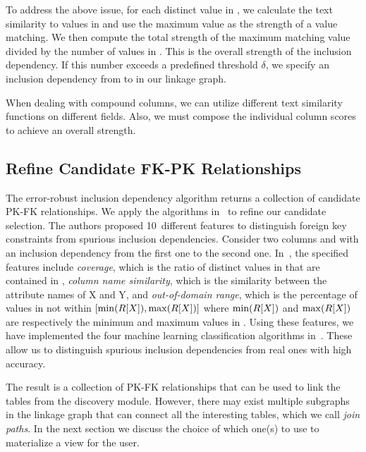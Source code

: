 To address the above issue, for each distinct value in \RX, we calculate the
text similarity to values in \SY and use the maximum value as the strength of a
value matching. We then compute the total strength of the maximum matching value
divided by the number of values in \RX. This is the overall strength of the
inclusion dependency.  If this number exceeds a predefined threshold $\delta$,
we specify an inclusion dependency from \RX to \SY in our linkage graph.

When dealing with compound columns, we can utilize different text similarity functions on different fields. 
Also, we must compose the individual column scores to achieve an overall strength.


\subsection{Refine Candidate FK-PK Relationships}\label{subsec:refine}


The error-robust inclusion dependency algorithm returns a collection of candidate PK-FK relationships.
We apply the algorithms in~\cite{DBLP:conf/webdb/RostinABNL09} to refine our candidate selection. The authors proposed 10~different features to distinguish foreign key constraints from spurious inclusion dependencies. Consider two columns \RX and \SY with an inclusion dependency from the first one to the second one. In~\cite{DBLP:conf/webdb/RostinABNL09}, the specified features include 
\emph{coverage}, which is the ratio of distinct values in \RX that are contained in \SY, 
\emph{column name similarity}, which is the similarity between the attribute names of X and Y, 
and \emph{out-of-domain range}, which is the percentage of values in \SY not within $[\min(R[X]), \max(R[X])]$ where $\min(R[X])$ and $\max(R[X])$ are respectively the minimum and maximum values in \RX.
Using these features, we have implemented the four machine learning classification algorithms in~\cite{DBLP:conf/webdb/RostinABNL09}. These allow us to distinguish spurious inclusion dependencies from real ones  with high accuracy.

The result is a collection of PK-FK relationships that can be used to link the tables from the discovery module. However, there may exist multiple subgraphs in the linkage graph that can connect all the interesting tables, which we call \emph{join paths}. In the next section we discuss the choice of which one(s) to use to materialize a view for the user.


